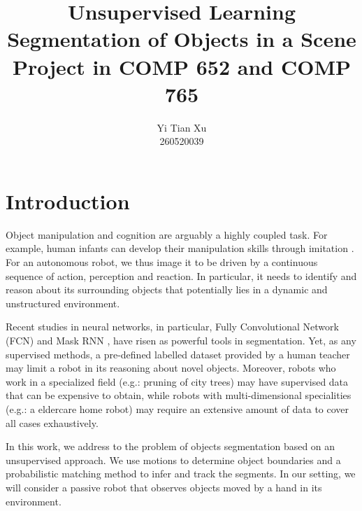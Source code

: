 \documentclass{article}
\begin{document}
\title{Unsupervised Learning Segmentation of Objects in a Scene\\
\large  Project in COMP 652 and COMP 765}
\author{Yi Tian Xu\\260520039}

\maketitle



\section{Introduction}
Object manipulation and cognition are arguably a highly coupled task. For example, human infants can develop their manipulation skills through imitation \cite{cogn1}. For an autonomous robot, we thus image it to be driven by a continuous sequence of action, perception and reaction. In particular, it needs to identify and reason about its surrounding objects that potentially lies in a dynamic and unstructured environment. 

Recent studies in neural networks, in particular, Fully Convolutional Network (FCN) \cite{fcn} and Mask RNN \cite{rnn}, have risen as powerful tools in segmentation. Yet, as any supervised methods, a pre-defined labelled dataset provided by a human teacher may limit a robot in its reasoning about novel objects. Moreover, robots who work in a specialized field (e.g.: pruning of city trees) may have supervised data that can be expensive to obtain, while robots with multi-dimensional specialities (e.g.: a eldercare home robot) may require an extensive amount of data to cover all cases exhaustively.

In this work, we address to the problem of objects segmentation based on an unsupervised approach. We use motions to determine object boundaries and a probabilistic matching method to infer and track the segments. In our setting, we will consider a passive robot that observes objects moved by a hand in its environment.
\end{document}
